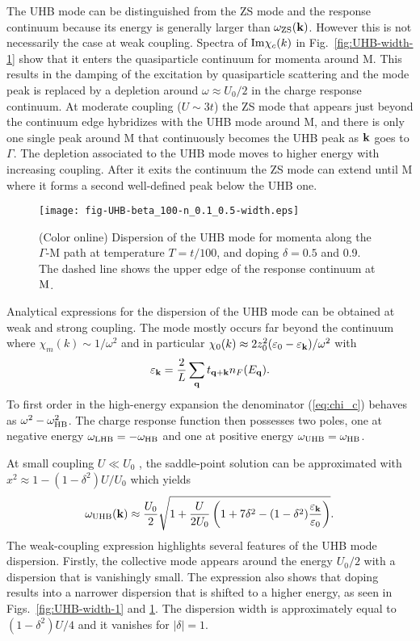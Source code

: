 \documentclass[showpacs,amsmath,twocolumn,floatfix]{revtex4-1}
\begin{document}
The UHB mode can be distinguished from the ZS mode and the response 
continuum because its energy is generally larger than $\omega_{\rm ZS}({\bf k})$. 
However this is not necessarily the case at weak coupling. Spectra of 
${\rm Im}\chi_c(k)$ in Fig.~\ref{fig:UHB-width-1} show that it enters the 
quasiparticle continuum for momenta around M. This results in the damping of 
the excitation by quasiparticle scattering and the mode peak is replaced by a 
depletion around $\omega \approx U_0/2$ in the charge response continuum. At 
moderate coupling ($U \sim 3t$) the ZS mode that appears just beyond the 
continuum edge hybridizes with the UHB mode around M, and there is only one single 
peak around M that continuously becomes the UHB peak as ${\bf k}$ goes to 
$\Gamma$. The depletion associated to the UHB mode moves to higher energy 
with increasing coupling. After it exits the continuum the ZS mode can extend 
until M where it forms a second well-defined peak below the UHB one.


\begin{figure}[b]
  \texttt{[image: fig-UHB-beta\_100-n\_0.1\_0.5-width.eps]}
  \caption{(Color online) Dispersion of the UHB mode for momenta along the 
  $\Gamma$-M path at temperature $T=t/100$, and doping $\delta=0.5$ and 0.9. 
  The dashed line shows the upper edge of the response continuum at ${\rm M}$.}
  \label{fig:UHB-width-2}
\end{figure}


Analytical expressions for the dispersion of the UHB mode can be obtained at weak 
and strong coupling. The mode mostly occurs far beyond the continuum where 
$\chi_m(k) \sim 1/\omega^2$ and in particular 
$\chi_0(k) \approx 2 z_0^2 (\varepsilon_0 - \varepsilon_{\bf k})/\omega^2$ with
\begin{equation}
 \varepsilon_{\bf k} = \frac{2}{L} \sum_{{\bf q}} t_{{\bf q}+{\bf k}} n_F(E_{{\bf q}}). 
 \label{eq:epsk}
\end{equation} 
To first order in the high-energy expansion the denominator (\ref{eq:chi_c}) behaves 
as $\omega^2 - \omega_{\rm HB}^2$. The charge response function then possesses two 
poles, one at negative energy $\omega_{\rm LHB} = -\omega_{\rm HB}$ and one at 
positive energy $\omega_{\rm UHB} = \omega_{\rm HB}$.


At small coupling $U\ll U_0$ , the saddle-point solution can be approximated with
$x^2\approx 1 - (1-\delta^2) U/U_0$ which yields
\begin{equation}
 \omega_{\rm UHB}({\bf k}) \approx \frac{U_0}{2} \sqrt{1 + \frac{U}{2U_0} 
 \left( 1+7\delta^2 - (1-\delta^2)\frac{\varepsilon_{\bf k}}{\varepsilon_0}\right)}.
 \label{eq:wuhb1}
\end{equation}
The weak-coupling expression highlights several features of the UHB mode dispersion. 
Firstly, the collective mode appears around the energy $U_0/2$ with a dispersion that 
is vanishingly small. The expression also shows that doping results into a narrower 
dispersion that is shifted to a higher energy, as seen in Figs.~\ref{fig:UHB-width-1} 
and \ref{fig:UHB-width-2}. The dispersion width is approximately equal to 
$(1-\delta^2) U/4$ and it vanishes for $|\delta|=1$. 
\end{document}
